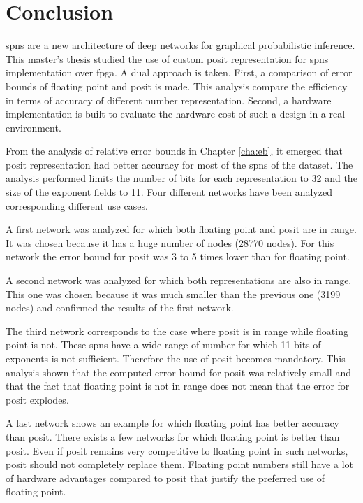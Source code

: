
\chapter{Conclusion}
\label{cha:conclusion}



\Glspl{spn} are a new architecture \cite{spns} of deep networks for graphical probabilistic inference. This master's thesis studied the use of custom posit representation for \glspl{spn} implementation over \gls{fpga}. A dual approach is taken. First, a comparison of error bounds of floating point and posit is made. This analysis compare the efficiency in terms of accuracy of different number representation. Second, a hardware implementation is built to evaluate the hardware cost of such a design in a real environment.

\vspace{0.5cm}

From the analysis of relative error bounds in Chapter \ref{cha:eb}, it emerged that posit representation had better accuracy for most of the \glspl{spn} of the dataset. The analysis performed limits the number of bits for each representation to 32 and the size of the exponent fields to 11. Four different networks have been analyzed corresponding different use cases.

A first network was analyzed for which both floating point and posit are in range. It was chosen because it has a huge number of nodes (28770 nodes). For this network the error bound for posit was 3 to 5 times lower than for floating point.

A second network was analyzed for which both representations are also in range. This one was chosen because it was much smaller than the previous one (3199 nodes) and confirmed the results of the first network.

The third network corresponds to the case where posit is in range while floating point is not. These \glspl{spn} have a wide range of number for which 11 bits of exponents is not sufficient. Therefore the use of posit becomes mandatory. This analysis shown that the computed error bound for posit was relatively small and that the fact that floating point is not in range does not mean that the error for posit explodes.

A last network shows an example for which floating point has better accuracy than posit. There exists a few networks for which floating point is better than posit. Even if posit remains very competitive to floating point in such networks, posit should not completely replace them. Floating point numbers still have a lot of hardware advantages compared to posit that justify the preferred use of floating point.

